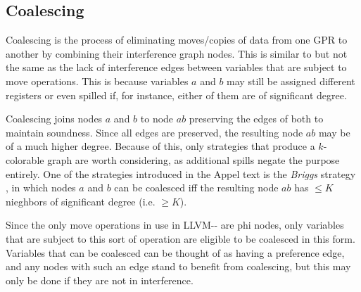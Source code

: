 \documentclass{article}
\begin{document}



\subsection{Coalescing} \label{coalescing}


Coalescing is the process of eliminating moves/copies of data from one GPR to another by combining their interference graph nodes.  This is similar to but  not the same as  the lack of interference edges between variables that are subject to move operations. This is because variables \(a\) and \(b\) may still be assigned different registers or even spilled if,  for instance, either of them are of significant degree.

Coalescing joins nodes \(a\) and \(b\) to node \(ab\) preserving the edges of both to maintain soundness.
Since all edges are preserved, the resulting node \(ab\) may be of a much higher degree. Because of this, only strategies that produce a \(k\)-colorable graph are worth considering, as additional spills negate the purpose entirely. One of the  strategies introduced in the Appel text is the \textit{Briggs} strategy  \cite[232]{tiger}, in which nodes \(a\) and \(b\) can be coalesced iff the resulting node \(ab\) has \(\leq K\) nieghbors of significant degree  (i.e. \(\geq K\)).

Since the only move operations in use in LLVM-{}- are phi nodes, only variables that are subject to this sort of operation are eligible to be coalesced in this form. 
Variables that can be coalesced can be thought of as having a preference edge, and any nodes with such an edge stand to benefit from coalescing, but this may only be done if they are not in interference.

\end{document}
